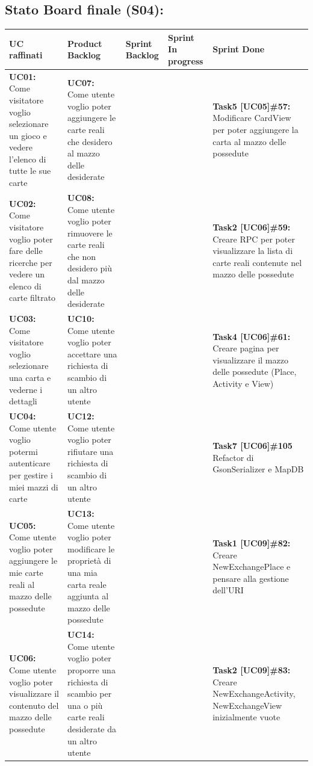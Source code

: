 \documentclass[a4paper, oneside]{article}
\begin{document}
\begin{landscape}
        \subsection{Stato Board finale (S04):}
        \small
        \def\arraystretch{2}%
        \begin{tabular}{ | p{5cm} | p{5cm} | p{3cm} | p{3cm} | p{7cm}| }
            \hline
            \textbf{UC raffinati}
            & \textbf{Product Backlog}
            & \textbf{Sprint Backlog}
            & \textbf{Sprint In progress}
            & \textbf{Sprint Done} \\
            \hline
            \hline
            \textbf{UC01:} Come visitatore voglio selezionare un gioco e vedere l'elenco di tutte le sue carte
            &  \textbf{UC07:} Come utente voglio poter aggiungere le carte reali che desidero al mazzo delle desiderate  &  &  & \textbf{Task5 [UC05]\#57:} Modificare CardView per poter aggiungere la carta al mazzo delle possedute \\
            \hline
            \textbf{UC02:} Come visitatore voglio poter fare delle ricerche per vedere un elenco di carte filtrato
            &  \textbf{UC08:} Come utente voglio poter rimuovere le carte reali che non desidero più dal mazzo delle desiderate &  & &\textbf{Task2 [UC06]\#59:} Creare RPC per poter visualizzare la lista di carte reali contenute nel mazzo delle possedute \\
            \hline
            \textbf{UC03:} Come visitatore voglio selezionare una carta e vederne i dettagli
            & \textbf{UC10:} Come utente voglio poter accettare una richiesta di scambio di un altro utente &  & &\textbf{Task4 [UC06]\#61:} Creare pagina per visualizzare il mazzo delle possedute (Place, Activity e View) \\
            \hline
            \textbf{UC04:}  Come utente voglio potermi autenticare per gestire i miei mazzi di carte & \textbf{UC12:} Come utente voglio poter rifiutare una richiesta di scambio di un altro utente & & & \textbf{Task7 [UC06]\#105} Refactor di GsonSerializer e MapDB \\
            \hline
            \textbf{UC05:} Come utente voglio poter aggiungere le mie carte reali al mazzo delle possedute & \textbf{UC13:} Come utente voglio poter modificare le proprietà di una mia carta reale aggiunta al mazzo delle possedute & & & \textbf{Task1 [UC09]\#82:} Creare NewExchangePlace e pensare alla gestione dell'URI \\
            \hline
            \textbf{UC06:} Come utente voglio poter visualizzare il contenuto del mazzo delle possedute & \textbf{UC14:} Come utente voglio poter proporre una richiesta di scambio per una o più carte reali desiderate da un altro utente  & & &  \textbf{Task2 [UC09]\#83:} Creare NewExchangeActivity, NewExchangeView inizialmente vuote \\

\end{tabular}
\end{landscape}
\end{document}
